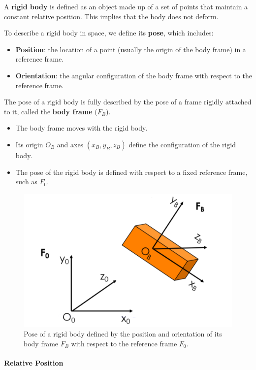 A \textbf{rigid body} is defined as an object made up of a set of points that maintain a constant relative position. This implies that the body does not deform.

To describe a rigid body in space, we define its \textbf{pose}, which includes:
\begin{itemize}
  \item \textbf{Position}: the location of a point (usually the origin of the body frame) in a reference frame.
  \item \textbf{Orientation}: the angular configuration of the body frame with respect to the reference frame.
\end{itemize}

The pose of a rigid body is fully described by the pose of a frame rigidly attached to it, called the \textbf{body frame} ($F_B$).

\begin{itemize}
  \item The body frame moves with the rigid body.
  \item Its origin $O_B$ and axes $(x_B, y_B, z_B)$ define the configuration of the rigid body.
  \item The pose of the rigid body is defined with respect to a fixed reference frame, such as $F_0$.
\end{itemize}

\begin{figure}[H]
  \centering
  \includegraphics[width=0.6\linewidth]{imgs/pose_body_frame.png}
  \caption{Pose of a rigid body defined by the position and orientation of its body frame $F_B$ with respect to the reference frame $F_0$.}
\end{figure}

\hfill

\paragraph{Relative Position} \hfill


